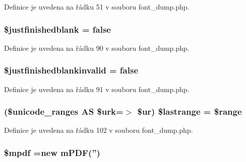 Definice je uvedena na řádku 51 v souboru font\-\_\-dump.\-php.

\hypertarget{font__dump_8php_a5cf1d6910240e03965be9beb01aae219}{
\subsubsection[{\$justfinishedblank}]{\setlength{\rightskip}{0pt plus 5cm}\$justfinishedblank = {\bf false}}}\label{font__dump_8php_a5cf1d6910240e03965be9beb01aae219}


Definice je uvedena na řádku 90 v souboru font\-\_\-dump.\-php.

\hypertarget{font__dump_8php_a848c618c4ef3de2f7f7b61b6443fcf41}{
\subsubsection[{\$justfinishedblankinvalid}]{\setlength{\rightskip}{0pt plus 5cm}\$justfinishedblankinvalid = {\bf false}}}\label{font__dump_8php_a848c618c4ef3de2f7f7b61b6443fcf41}


Definice je uvedena na řádku 91 v souboru font\-\_\-dump.\-php.

\hypertarget{font__dump_8php_a62810da74f01f626696ab25d73e9ec48}{
\subsubsection[{\$lastrange}]{ (\$unicode\-\_\-ranges A\-S \$urk=$>$ \$ur) \$lastrange = \$range}}\label{font__dump_8php_a62810da74f01f626696ab25d73e9ec48}


Definice je uvedena na řádku 102 v souboru font\-\_\-dump.\-php.

\hypertarget{font__dump_8php_ad028f81910d6cbab9b184d2214b3a8f8}{
\subsubsection[{\$mpdf}]{\setlength{\rightskip}{0pt plus 5cm}\$mpdf =new {\bf m\-P\-D\-F}('')}}\label{font__dump_8php_ad028f81910d6cbab9b184d2214b3a8f8}


